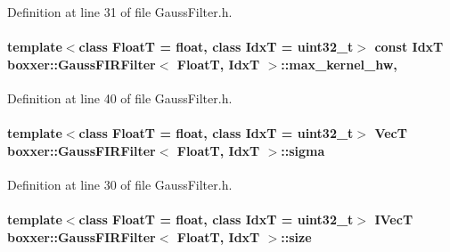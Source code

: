 Definition at line 31 of file Gauss\+Filter.\+h.

\paragraph[{\texorpdfstring{max\+\_\+kernel\+\_\+hw}{max_kernel_hw}}]{\setlength{\rightskip}{0pt plus 5cm}template$<$class FloatT = float, class IdxT = uint32\+\_\+t$>$ const IdxT {\bf boxxer\+::\+Gauss\+F\+I\+R\+Filter}$<$ FloatT, IdxT $>$\+::max\+\_\+kernel\+\_\+hw\hspace{0.3cm}{\ttfamily [static]}, {\ttfamily [protected]}}\hypertarget{classboxxer_1_1GaussFIRFilter_a7f85e018f78753ee4fedf65c04b0c65a}{}\label{classboxxer_1_1GaussFIRFilter_a7f85e018f78753ee4fedf65c04b0c65a}


Definition at line 40 of file Gauss\+Filter.\+h.

\paragraph[{\texorpdfstring{sigma}{sigma}}]{\setlength{\rightskip}{0pt plus 5cm}template$<$class FloatT = float, class IdxT = uint32\+\_\+t$>$ {\bf VecT} {\bf boxxer\+::\+Gauss\+F\+I\+R\+Filter}$<$ FloatT, IdxT $>$\+::sigma}\hypertarget{classboxxer_1_1GaussFIRFilter_a66ced06c688fd544d5f1f8be39aa2125}{}\label{classboxxer_1_1GaussFIRFilter_a66ced06c688fd544d5f1f8be39aa2125}


Definition at line 30 of file Gauss\+Filter.\+h.

\paragraph[{\texorpdfstring{size}{size}}]{\setlength{\rightskip}{0pt plus 5cm}template$<$class FloatT = float, class IdxT = uint32\+\_\+t$>$ {\bf I\+VecT} {\bf boxxer\+::\+Gauss\+F\+I\+R\+Filter}$<$ FloatT, IdxT $>$\+::size}\hypertarget{classboxxer_1_1GaussFIRFilter_ac0d4e19bb2be3e8913e77283e7e4317e}{}\label{classboxxer_1_1GaussFIRFilter_ac0d4e19bb2be3e8913e77283e7e4317e}


